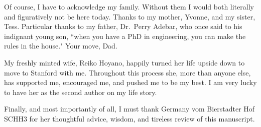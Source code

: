 \documentclass[12pt,twoside]{report}
\begin{document}
Of course, I have to acknowledge my family. Without them I would both literally and figuratively not be here today. Thanks to my mother, Yvonne, and my sister, Tess. Particular thanks to my father, Dr.\ Perry Adebar, who once said to his indignant young son, ``when you have a PhD in engineering, you can make the rules in the house." Your move, Dad.

My freshly minted wife, Reiko Hoyano, happily turned her life upside down to move to Stanford with me. Throughout this process she, more than anyone else, has supported me, encouraged me, and pushed me to be my best. I am very lucky to have her as the second author on my life story.

Finally, and most importantly of all, I must thank Germany vom Bierstadter Hof SCHH3 for her thoughtful advice, wisdom, and tireless review of this manuscript.


\tableofcontents

\listoftables

\listoffigures

 













\end{document}
